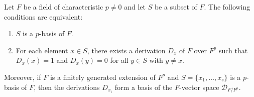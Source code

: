 Let $F$ be a field of characteristic $p \neq 0$ and let $S$ be a subset of $F$. The following conditions are equivalent:
\begin{enumerate}
  \item $S$ is a $p$-basis of $F$.
  \item For each element $x \in S$, there exists a derivation $D_x$ of $F$ over $F^p$ such that $D_x(x) = 1$ and $D_x(y) = 0$ for all $y \in S$ with $y \neq x$.
\end{enumerate}
Moreover, if $F$ is a finitely generated extension of $F^p$ and $S = \{x_1, \ldots, x_s\}$ is a $p$-basis of $F$, then the derivations $D_{x_i}$ form a basis of the $F$-vector space $\mathcal{D}_{F/F^p}$.
